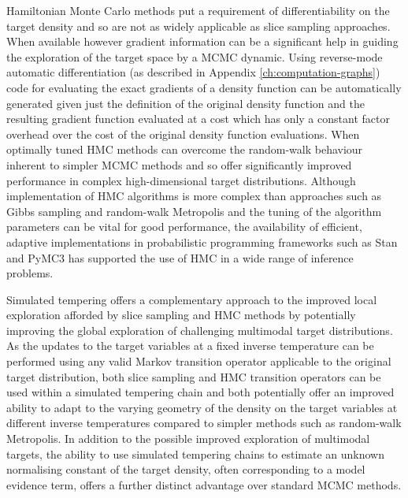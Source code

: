 Hamiltonian Monte Carlo methods put a requirement of differentiability on the target density and so are not as widely applicable as slice sampling approaches. When available however gradient information can be a significant help in guiding the exploration of the target space by a \ac{MCMC} dynamic. Using reverse-mode automatic differentiation (as described in Appendix \ref{ch:computation-graphs}) code for evaluating the exact gradients of a density function can be automatically generated given just the definition of the original density function and the resulting gradient function evaluated at a cost which has only a constant factor overhead over the cost of the original density function evaluations. When optimally tuned \ac{HMC} methods can overcome the random-walk behaviour inherent to simpler \ac{MCMC} methods and so offer significantly improved performance in complex high-dimensional target distributions. Although implementation of \ac{HMC} algorithms is more complex than approaches such as Gibbs sampling and random-walk Metropolis and the tuning of the algorithm parameters can be vital for good performance, the availability of efficient, adaptive implementations in probabilistic programming frameworks such as Stan \citep{carpenter2016stan} and PyMC3 \citep{salvatier2016probabilistic} has supported the use of \ac{HMC} in a wide range of inference problems.

Simulated tempering offers a complementary approach to the improved local exploration afforded by slice sampling and \ac{HMC} methods by potentially improving the global exploration of challenging multimodal target distributions. As the updates to the target variables at a fixed inverse temperature can be performed using any valid Markov transition operator applicable to the original target distribution, both slice sampling and \ac{HMC} transition operators can be used within a simulated tempering chain and both potentially offer an improved ability to adapt to the varying geometry of the density on the target variables at different inverse temperatures compared to simpler methods such as random-walk Metropolis. In addition to the possible improved exploration of multimodal targets, the ability to use simulated tempering chains to estimate an unknown normalising constant of the target density, often corresponding to a model evidence term, offers a further distinct advantage over standard \ac{MCMC} methods. 

